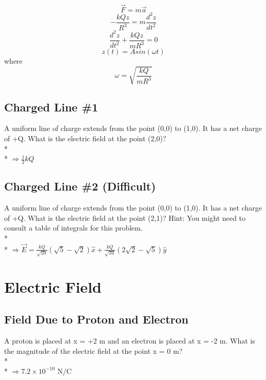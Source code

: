\documentclass[11pt]{article}
\begin{document}
\begin{equation}
\vec{F} = m \vec{a}
\end{equation}
\begin{equation}
-\frac{kQz}{R^3} = m\frac{d^2z}{dt^2}
\end{equation}
\begin{equation}
\frac{d^2z}{dt^2} + \frac{kQz}{mR^3} = 0
\end{equation}
\begin{equation}
z(t) = Asin(\omega t)
\end{equation}
where
\begin{equation}
\omega = \sqrt{\frac{kQ}{mR^3}}
\end{equation}

\pagebreak
\subsection{Charged Line \#1}
A uniform line of charge extends from the point (0,0) to (1,0).  It has a net charge of +Q.  What is the electric field at the point (2,0)? \\* \\*
$\Rightarrow \frac{1}{2}kQ$

\subsection{Charged Line \#2 (Difficult)}
A uniform line of charge extends from the point (0,0) to (1,0).  It has a net charge of +Q.  What is the electric field at the point (2,1)?  Hint: You might need to consult a table of integrals for this problem. \\* \\*
$\Rightarrow \vec{E} = \frac{kQ}{\sqrt{10}}(\sqrt{5} - \sqrt{2})\hat{x} + \frac{kQ}{\sqrt{10}}(2\sqrt{2} - \sqrt{5})\hat{y}$


\pagebreak
\section{Electric Field}
\vspace{10pt}

\subsection{Field Due to Proton and Electron}
A proton is placed at x = +2 m and an electron is placed at x = -2 m.  What is the magnitude of the electric field at the point x = 0 m?\\* \\*
$\Rightarrow 7.2 \times 10^{-10}$ N/C
\end{document}

